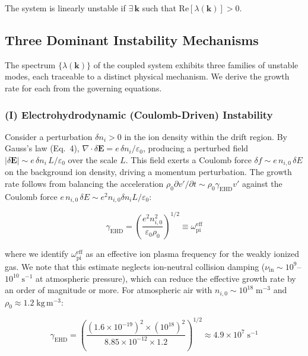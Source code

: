 \documentclass[12pt,twocolumn]{article}
\newcommand{\ee}{\mathbf{E}}
\begin{document}
The system is linearly unstable if $\exists\,\mathbf{k}$ such that
$\mathrm{Re}[\lambda(\mathbf{k})] > 0$.

\subsection{Three Dominant Instability Mechanisms}
\label{sec:stability:instabilities}

The spectrum $\{\lambda(\mathbf{k})\}$ of the coupled system
exhibits three families of unstable modes, each traceable to a
distinct physical mechanism. We derive the growth rate for each
from the governing equations.

\subsubsection{(I) Electrohydrodynamic (Coulomb-Driven) Instability}

Consider a perturbation $\delta n_i > 0$ in the ion density within
the drift region. By Gauss's law (Eq.~4),
$\nabla \cdot \delta\ee = e\,\delta n_i / \varepsilon_0$, producing
a perturbed field $|\delta\ee| \sim e\,\delta n_i\,L / \varepsilon_0$
over the scale $L$. This field exerts a Coulomb force
$\delta f \sim e\,n_{i,0}\,\delta E$ on the background ion density,
driving a momentum perturbation. The growth rate follows from
balancing the acceleration $\rho_0 \partial v' / \partial t
\sim \rho_0 \gamma_{\mathrm{EHD}} v'$ against the Coulomb force
$e\,n_{i,0}\,\delta E \sim e^2 n_{i,0} \delta n_i L /
\varepsilon_0$:

\begin{equation}
  \gamma_{\mathrm{EHD}}
  = \left(\frac{e^2 n_{i,0}^2}{\varepsilon_0 \rho_0}\right)^{1/2}
  \equiv \omega_{\mathrm{pi}}^{\mathrm{eff}}
  \label{eq:gamma_EHD}
\end{equation}

where we identify $\omega_{\mathrm{pi}}^{\mathrm{eff}}$ as an
effective ion plasma frequency for the weakly ionized gas. We note
that this estimate neglects ion-neutral collision damping
($\nu_{\mathrm{in}} \sim 10^{9}$--$10^{10}\;\mathrm{s^{-1}}$ at
atmospheric pressure), which can reduce the effective growth rate
by an order of magnitude or more. For atmospheric air with
$n_{i,0} \sim 10^{18}\;\mathrm{m^{-3}}$ and
$\rho_0 \approx 1.2\;\mathrm{kg\,m^{-3}}$:

\begin{equation}
  \gamma_{\mathrm{EHD}}
  = \left(
    \frac{(1.6 \times 10^{-19})^2 \times (10^{18})^2}
         {8.85 \times 10^{-12} \times 1.2}
  \right)^{1/2}
  \approx 4.9 \times 10^7\;\mathrm{s^{-1}}
  \label{eq:gamma_EHD_num}
\end{equation}
\end{document}
